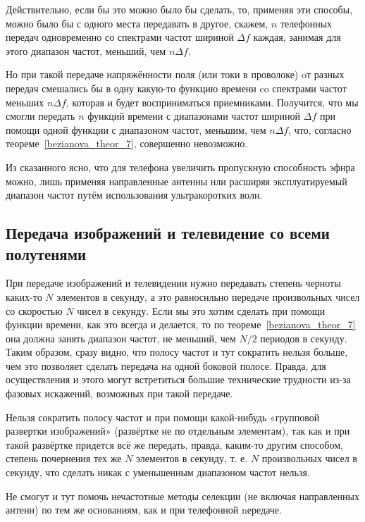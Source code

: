 Действительно, если бы это можно было бы сделать, то, применяя эти способы, можно было бы с одного места передавать в другое, скажем, $n$ телефонных передач одновременно со спектрами частот шириной $\Delta f$ каждая, занимая для этого диапазон частот, меньший, чем $n \Delta f$.

Но при такой передаче напряжённости поля (или токи в проволоке) oт разных передач смешались бы в одну какую-то функцию времени co спектрами частот меньших $n \Delta f$, которая и будет восприниматься приемниками. Получится, что мы смогли передать $n$ функций времени с диапазонами частот шириной $\Delta f$ при помощи одной функции с диапазоном частот, меньшим, чем $n \Delta f$, что, согласно теореме~\ref{bezianova_theor_7}, совершенно невозможно.

Из сказанного ясно, что для телефона увеличить пропускную способность эфнра можно, лишь применяя направленные антенны нли расширяя эксплуатируемый диапазон частот путём использования ультракоротких волн.

\subsection*{Передача изображений и телевидение со всеми полутенями}

\qquad При передаче изображений и телевидении нужно передавать степень черноты каких-то $N$ элементов в секунду, а это равноснльно передаче произвольных чисел со скоростью $N$ чисел в секунду. Если мы это хотим сделать при помощи функции времени, как это всегда и делается, то по теореме~\ref{bezianova_theor_7} она должна занять диапазон частот, не меньший, чем $N / 2$ периодов в секунду. Таким образом, сразу видно, что полосу частот и тут сократить нельзя больше, чем это позволяет сделать передача на одной боковой полосе. Правда, для осуществления и этого могут встретиться большие технические трудности из-за фазовых искажений, возможных при такой передаче.

Нельзя сократить полосу частот и при помощи какой-нибудь «групповой развертки изображений» (развёртке не по отдельным элементам), так как и при такой развёртке придется всё же передать, правда, каким-то другим способом, степень почернения тех же $N$ элементов в секунду, т. е. $N$ произвольных чисел в секунду, что сделать никак с уменьшенным диапазоном частот нельзя.

Не смогут и тут помочь нечастотные методы селекции (не включая направленных антенн) по тем же основаниям, как и при телефонной nередаче.

